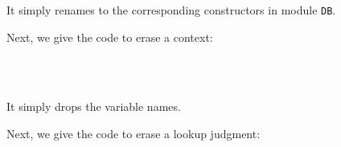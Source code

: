 It simply renames to the corresponding constructors in module
\texttt{DB}.

Next, we give the code to erase a context:

\begin{fence}
\begin{code}%
\>[0]\AgdaSpace{}%
\AgdaSymbol{:}\AgdaSpace{}%
\AgdaSpace{}%
\AgdaSpace{}%
\<%
\\
\>[0]\AgdaSpace{}%
\AgdaSpace{}%
%
\>[21]\AgdaSymbol{=}%
\>[24]\<%
\\
\>[0]\AgdaSpace{}%
\AgdaSpace{}%
\AgdaOperator{\AgdaInductiveConstructor{,}}\AgdaSpace{}%
\AgdaSpace{}%
\AgdaSpace{}%
\AgdaSpace{}%
%
\>[21]\AgdaSymbol{=}%
\>[24]\AgdaSpace{}%
\AgdaSpace{}%
\AgdaSpace{}%
\AgdaSpace{}%
\AgdaSpace{}%
\AgdaSpace{}%
\<%
\end{code}
\end{fence}

It simply drops the variable names.

Next, we give the code to erase a lookup judgment:

\begin{fence}
\begin{code}%
\>[0]\AgdaSpace{}%
\AgdaSymbol{:}\AgdaSpace{}%
\AgdaSpace{}%
\AgdaSymbol{\{}\AgdaSpace{}%
\AgdaSpace{}%
\AgdaSymbol{\}}\AgdaSpace{}%
\AgdaSpace{}%
\AgdaSpace{}%
\AgdaSpace{}%
\AgdaSpace{}%
\AgdaSpace{}%
\AgdaSpace{}%
\AgdaSpace{}%
\AgdaSpace{}%
\AgdaSpace{}%
\AgdaSpace{}%
\AgdaSpace{}%
\AgdaSpace{}%
\AgdaSpace{}%
\<%
\\
\>[0]\AgdaSpace{}%
\AgdaSpace{}%
%
\>[21]\AgdaSymbol{=}%
\>[24]\<%
\\
\>[0]\AgdaSpace{}%
\AgdaSpace{}%
\AgdaSpace{}%
\AgdaSpace{}%
%
\>[21]\AgdaSymbol{=}%
\>[24]\AgdaSpace{}%
\AgdaSpace{}%
\AgdaSpace{}%
\<%
\end{code}
\end{fence}

